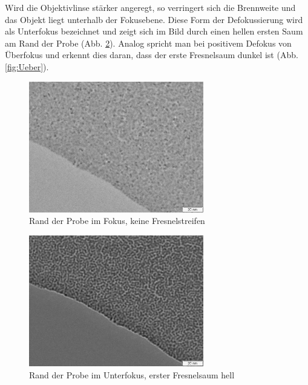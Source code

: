 Wird die Objektivlinse stärker angeregt, so verringert sich die Brennweite und das Objekt liegt unterhalb der Fokusebene. Diese Form der Defokussierung wird als Unterfokus bezeichnet und zeigt sich im Bild durch einen hellen ersten Saum am Rand der Probe  (Abb. \ref{fig:Unter}). Analog spricht man bei positivem Defokus von Überfokus und erkennt dies daran, dass der erste Fresnelsaum dunkel ist  (Abb. \ref{fig:Ueber}).
\begin{figure}[p]
	\vspace{-1.5em}
	\centering
	\includegraphics[width=0.68\textwidth]{data/Im_1.jpg}
	\vspace{-1.5ex}
	\caption{Rand der Probe im Fokus, keine Fresnelstreifen}			\label{fig:Fokus}
	\vspace{-1em}
\end{figure}

\begin{figure}[p]
	\centering
	\includegraphics[width=0.68\textwidth]{data/Im_3.jpg}
	\vspace{-1.5ex}
	\caption{Rand der Probe im Unterfokus, erster Fresnelsaum hell}		\label{fig:Unter}
	\vspace{-1em}
\end{figure}

